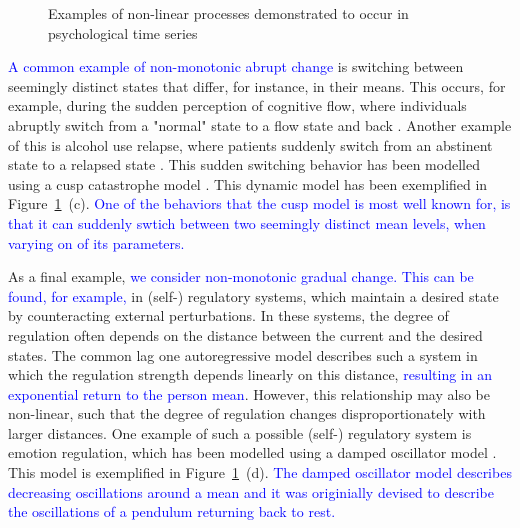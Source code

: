 \documentclass[man, floatsintext]{apa7}
\begin{document}
\begin{figure}[!t]
  \caption{Examples of non-linear processes demonstrated to occur in
    psychological time series}
  \label{fig:examplar_npn}
\end{figure}

\textcolor{blue}{A common example of non-monotonic abrupt change}
is switching between seemingly distinct
states that differ, for instance, in their means. This occurs, for example,
during the sudden perception of cognitive flow, where individuals abruptly
switch from a "normal" state to a flow state and back
\parencite{ceja_suddenly_2012}. Another example of this is alcohol use relapse,
where patients suddenly switch from an abstinent state to a relapsed state
\parencite{witkiewitz_modeling_2007}. This sudden switching behavior has been
modelled using a cusp catastrophe model
\parencite{van_der_maas_sudden_2003,chow_cusp_2015}. This dynamic model has
been exemplified in Figure~\ref{fig:examplar_npn}~(c). \textcolor{blue}{One
  of the behaviors that the cusp model is most well known for, is that it can
  suddenly swtich between two seemingly distinct mean levels, when varying on
  of its parameters.}

As a final example, \textcolor{blue}{we consider non-monotonic gradual change.
  This can be found, for example,} in (self-) regulatory systems, which
maintain a desired state by counteracting external perturbations. In these
systems, the degree of regulation often depends on the distance between the
current and the desired states. The common lag one autoregressive model
describes such a system in which the regulation strength depends linearly on
this distance, \textcolor{blue}{resulting in an exponential return to the
  person mean}. However, this relationship may also be non-linear, such that
the
degree of regulation changes disproportionately with larger distances. One
example of such a possible (self-) regulatory system is emotion regulation,
which has been modelled using a damped oscillator model
\parencite{chow_emotion_2005}. This model is exemplified in
Figure~\ref{fig:examplar_npn}~(d). \textcolor{blue}{The damped oscillator model
  describes decreasing oscillations around a mean and it was originially
  devised to describe the oscillations of a pendulum returning back to rest.}
\end{document}
